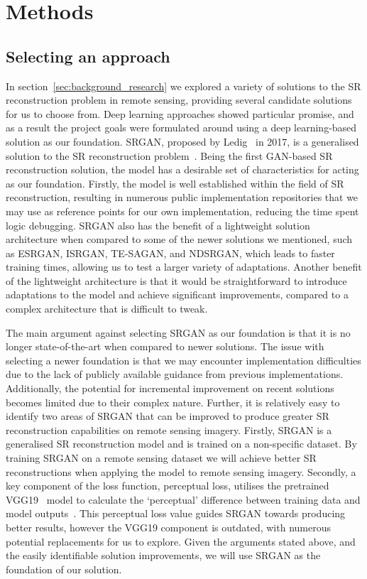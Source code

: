 \chapter{Methods}\label{chapter2}
\section{Selecting an approach}\label{sec:selecting_an_approach}
In section~\ref{sec:background_research} we explored a variety of solutions to the SR reconstruction problem in remote sensing, providing several candidate solutions for us to choose from. Deep learning approaches showed particular promise, and as a result the project goals were formulated around using a deep learning-based solution as our foundation. SRGAN, proposed by Ledig \etal\ in 2017, is a generalised solution to the SR reconstruction problem~\cite{srgan}. Being the first GAN-based SR reconstruction solution, the model has a desirable set of characteristics for acting as our foundation. Firstly, the model is well established within the field of SR reconstruction, resulting in numerous public implementation repositories that we may use as reference points for our own implementation, reducing the time spent logic debugging. SRGAN also has the benefit of a lightweight solution architecture when compared to some of the newer solutions we mentioned, such as ESRGAN, ISRGAN, TE-SAGAN, and NDSRGAN, which leads to faster training times, allowing us to test a larger variety of adaptations. Another benefit of the lightweight architecture is that it would be straightforward to introduce adaptations to the model and achieve significant improvements, compared to a complex architecture that is difficult to tweak.

The main argument against selecting SRGAN as our foundation is that it is no longer state-of-the-art when compared to newer solutions. The issue with selecting a newer foundation is that we may encounter implementation difficulties due to the lack of publicly available guidance from previous implementations. Additionally, the potential for incremental improvement on recent solutions becomes limited due to their complex nature. Further, it is relatively easy to identify two areas of SRGAN that can be improved to produce greater SR reconstruction capabilities on remote sensing imagery. Firstly, SRGAN is a generalised SR reconstruction model and is trained on a non-specific dataset. By training SRGAN on a remote sensing dataset we will achieve better SR reconstructions when applying the model to remote sensing imagery. Secondly, a key component of the loss function, perceptual loss, utilises the pretrained VGG19~\cite{vgg19} model to calculate the `perceptual' difference between training data and model outputs~\cite{srgan}. This perceptual loss value guides SRGAN towards producing better results, however the VGG19 component is outdated, with numerous potential replacements for us to explore. Given the arguments stated above, and the easily identifiable solution improvements, we will use SRGAN as the foundation of our solution.

